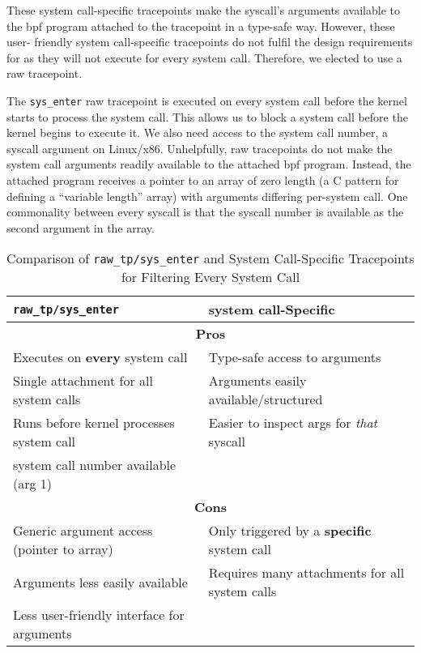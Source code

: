 These system call-specific tracepoints make the syscall's arguments available to the 
\ac{bpf} program attached to the tracepoint in a type-safe way. However, these user-
friendly system call-specific tracepoints do not fulfil the design requirements for \af 
as they will not execute for every system call. Therefore, we elected to use a
raw tracepoint.

The \texttt{sys\_enter} raw tracepoint is executed on every system call before the
kernel starts to process the system call. This allows us to block
a system call before the kernel begins to execute it. We also need
access to the system call number, a syscall argument on Linux/x86. Unhelpfully, 
raw tracepoints do not make the system call arguments readily available to the attached 
\ac{bpf} program. Instead, the attached program receives a pointer to an array of 
zero length (a C pattern for defining a ``variable length'' array) with arguments 
differing per-system call. One commonality between every syscall is that the syscall 
number is available as the second argument in the array. 

\begin{table}[h]
\centering
\caption{Comparison of \texttt{raw\_tp/sys\_enter} and System Call-Specific
Tracepoints for Filtering Every System Call}
\begin{tabular}{|p{6cm}|p{6cm}|}
\hline
\texttt{raw\_tp/sys\_enter} & \textbf{system call-Specific} \\
\hline
\multicolumn{2}{|c|}{\textbf{Pros}} \\
\hline
Executes on \textbf{every} system call & Type-safe access to arguments \\
Single attachment for all system calls & Arguments easily available/structured \\
Runs before kernel processes system call & Easier to inspect args for \textit{that} syscall \\
system call number available (arg 1) &  \\
\hline
\multicolumn{2}{|c|}{\textbf{Cons}} \\
\hline
Generic argument access (pointer to array) & Only triggered by a \textbf{specific} system call \\
Arguments less easily available & Requires many attachments for all system calls \\
Less user-friendly interface for arguments &  \\
\hline
\end{tabular}
\label{tab:tracepoint_comparison}
\end{table}

